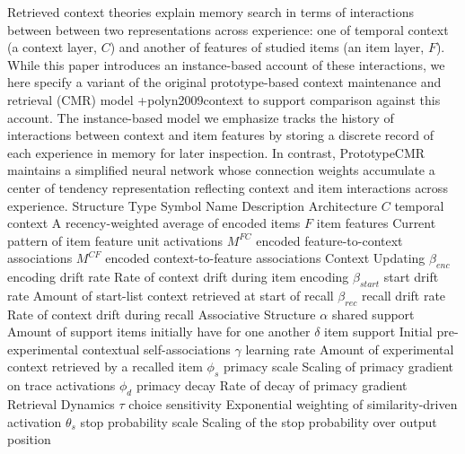 \markdownRendererInterblockSeparator
{}Retrieved context theories explain memory search in terms of interactions between between two representations across experience: one of temporal context (a context layer, $C$) and another of features of studied items (an item layer, $F$). While this paper introduces an instance-based account of these interactions, we here specify a variant of the original prototype-based context maintenance and retrieval (CMR) model +{}{}{polyn2009context} to support comparison against this account. The instance-based model we emphasize tracks the history of interactions between context and item features by storing a discrete record of each experience in memory for later inspection. In contrast, PrototypeCMR maintains a simplified neural network whose connection weights accumulate a center of tendency representation reflecting context and item interactions across experience. \markdownRendererInterblockSeparator
{}%
{{Structure Type}%
{Symbol}%
{Name}%
{Description}%
}%
{{Architecture}%
{}%
{}%
{}%
}%
{{}%
{$C$}%
{temporal context}%
{A recency-weighted average of encoded items}%
}%
{{}%
{$F$}%
{item features}%
{Current pattern of item feature unit activations}%
}%
{{}%
{$M^{FC}$}%
{}%
{encoded feature-to-context associations}%
}%
{{}%
{$M^{CF}$}%
{}%
{encoded context-to-feature associations}%
}%
{{Context Updating}%
{}%
{}%
{}%
}%
{{}%
{${\beta}_{enc}$}%
{encoding drift rate}%
{Rate of context drift during item encoding}%
}%
{{}%
{${\beta}_{start}$}%
{start drift rate}%
{Amount of start-list context retrieved at start of recall}%
}%
{{}%
{${\beta}_{rec}$}%
{recall drift rate}%
{Rate of context drift during recall}%
}%
{{Associative Structure}%
{}%
{}%
{}%
}%
{{}%
{${\alpha}$}%
{shared support}%
{Amount of support items initially have for one another}%
}%
{{}%
{${\delta}$}%
{item support}%
{Initial pre-experimental contextual self-associations}%
}%
{{}%
{${\gamma}$}%
{learning rate}%
{Amount of experimental context retrieved by a recalled item}%
}%
{{}%
{${\phi}_{s}$}%
{primacy scale}%
{Scaling of primacy gradient on trace activations}%
}%
{{}%
{${\phi}_{d}$}%
{primacy decay}%
{Rate of decay of primacy gradient}%
}%
{{Retrieval Dynamics}%
{}%
{}%
{}%
}%
{{}%
{${\tau}$}%
{choice sensitivity}%
{Exponential weighting of similarity-driven activation}%
}%
{{}%
{${\theta}_{s}$}%
{stop probability scale}%
{Scaling of the stop probability over output position}%
}%
